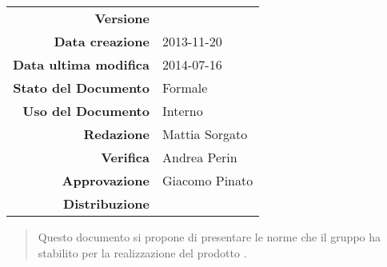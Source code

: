 

\newcommand{\Versione}{\versioneNormeDiProgetto{}}	%
\newcommand{\Data}{2013-11-20}						%
\newcommand{\DataUltimaModifica}{2014-07-16}
\newcommand{\TipoDocumento}{Norme di Progetto}		%



\begin{center}
\begin{tabular}{r|l}
\textbf{Versione} & \Versione{} \\
\textbf{Data creazione} & \Data{} \\
\textbf{Data ultima modifica} & \DataUltimaModifica{} \\
\textbf{Stato del Documento} & Formale \\		%
\textbf{Uso del Documento} & Interno \\			%
\textbf{Redazione} & Mattia Sorgato\\			%
\textbf{Verifica} & Andrea Perin \\
\textbf{Approvazione} & Giacomo Pinato \\			%
\textbf{Distribuzione} & \parbox[t]{4cm}{\NomeGruppo{}}\\
\end{tabular}
\end{center}

\vspace{0.05in}

\begin{abstract}
\begin{center}
Questo documento si propone di presentare le norme che il gruppo \NomeGruppo{} ha stabilito per la realizzazione del prodotto \Progetto{}.
\end{center}
\end{abstract}


